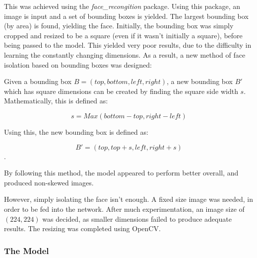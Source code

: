 \documentclass[10pt,a4paper]{article}
\begin{document}
            This was achieved using the \emph{face\_recongition} package. Using this package, an image is input and a set of bounding boxes is yielded. The largest bounding box (by area) is found,
            yielding the face. Initially, the bounding box was simply cropped and resized to be a square (even if it wasn't initially a square), before being passed to the model. This yielded very poor results,
            due to the difficulty in learning the constantly changing dimensions. As a result, a new method of face isolation based on bounding boxes was designed:

            Given a bounding box $B = (top, bottom, left, right)$, a new bounding box $B'$ which has square dimensions can be created by finding the square
            side width $s$. Mathematically, this is defined as:

            $$s = Max(bottom - top, right - left)$$

            Using this, the new bounding box is defined as:

            $$B' = (top, top + s, left, right + s)$$.

            By following this method, the model appeared to perform better overall, and produced non-skewed images.

            However, simply isolating the face isn't enough. A fixed size image was needed, in order to be fed into the network. After much experimentation, an image size of $(224, 224)$
            was decided, as smaller dimensions failed to produce adequate results. The resizing was completed using OpenCV.

            
        \subsubsection{The Model}
                
\end{document}
